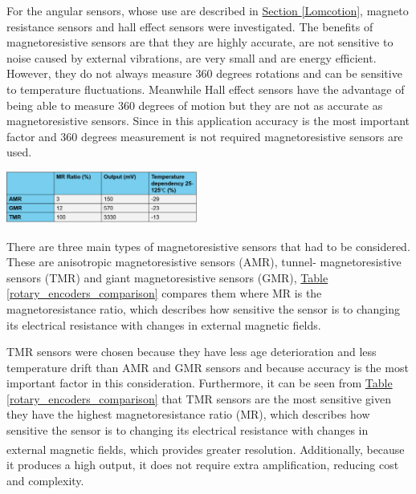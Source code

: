 \documentclass[11pt]{article}		%
\newcommand{\supercite}[1]{\textsuperscript{\cite{#1}}}		%
\newcommand{\tableref}[1]{\hyperref[#1]{Table \ref*{#1}}}     %
\newcommand{\sectref}[1]{\hyperref[#1]{Section \ref*{#1}}}     %
\begin{document}
            For the angular sensors, whose use are described in \sectref{Lomcotion}, magneto resistance sensors and hall effect sensors were investigated. The benefits of magnetoresistive sensors are that they are highly accurate, are not sensitive to noise caused by external vibrations, are very small and are energy efficient. However, they do not always measure 360 degrees rotations and can be sensitive to temperature fluctuations. Meanwhile Hall effect sensors have the advantage of being able to measure 360 degrees of motion but they are not as accurate as magnetoresistive sensors. Since in this application accuracy is the most important factor and 360 degrees measurement is not required magnetoresistive sensors are used.
           \begin{floatingfigure}[r]{0.5\textwidth}
					\centering
					\includegraphics[width=0.47\textwidth] {AMR_comparison table_formatted}
					\label{rotary_encoders_comparison}
			\end{floatingfigure}
            \hspace*{3ex}There are three main types of magnetoresistive sensors that had to be considered. These are anisotropic magnetoresistive sensors (AMR), tunnel- magnetoresistive sensors (TMR) and giant magnetoresistive sensors (GMR), \tableref{rotary_encoders_comparison} compares them where MR is the magnetoresistance ratio, which describes how sensitive the sensor is to changing its electrical resistance with changes in external magnetic fields.
            \begin{floatingfigure}[r]{0pt} \end{floatingfigure}
            \hspace*{3ex}TMR sensors were chosen because they have less age deterioration and less temperature drift than AMR and GMR sensors and because accuracy is the most important factor in this consideration. Furthermore, it can be seen from \tableref{rotary_encoders_comparison} that TMR sensors are the most sensitive given they have the highest magnetoresistance ratio (MR), which describes how sensitive the sensor is to changing its electrical resistance with changes in external magnetic fields,\supercite{magnetoresistance} which provides greater resolution. Additionally, because it produces a high output, it does not require extra amplification, reducing cost and complexity.
\end{document}
